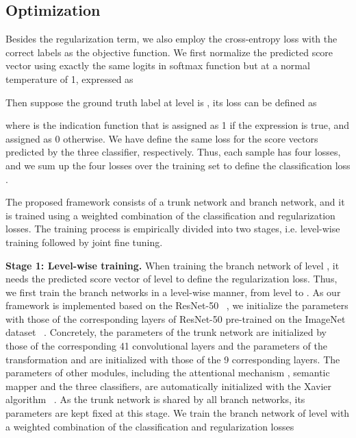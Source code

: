\documentclass[sigconf]{acmart}
\begin{document}
\subsection{Optimization}
Besides the regularization term, we also employ the cross-entropy loss with the correct labels as the objective function. We first normalize the predicted score vector using exactly the same logits in softmax function but at a normal temperature of 1, expressed as 

Then suppose the ground truth label at level  is , its loss can be defined as

where  is the indication function that is assigned as 1 if the expression is true, and assigned as 0 otherwise. We have define the same loss for the score vectors predicted by the three classifier, respectively. Thus, each sample has four losses, and we sum up the four losses over the training set to define the classification loss .




The proposed framework consists of a trunk network and  branch network, and it is trained using a weighted combination of the classification and regularization losses. The training process is empirically divided into two stages, i.e. level-wise training followed by joint fine tuning.


\noindent\textbf{Stage 1: Level-wise training. }
When training the branch network of level , it needs the predicted score vector of level  to define the regularization loss. Thus, we first train the branch networks in a level-wise manner, from level  to . As our framework is implemented based on the ResNet-50 ~\cite{he2016deep}, we initialize the parameters with those of the corresponding layers of ResNet-50 pre-trained on the ImageNet dataset ~\cite{deng2009imagenet}. Concretely, the parameters of the trunk network are initialized by those of the corresponding 41 convolutional layers and the parameters of the transformation  and  are initialized with those of the 9 corresponding layers. The parameters of other modules, including the attentional mechanism , semantic mapper  and the three classifiers, are automatically initialized with the Xavier algorithm ~\cite{glorot2010understanding}. As the trunk network is shared by all branch networks, its parameters are kept fixed at this stage. We train the branch network of level  with a weighted combination of the classification and regularization losses 
\end{document}
